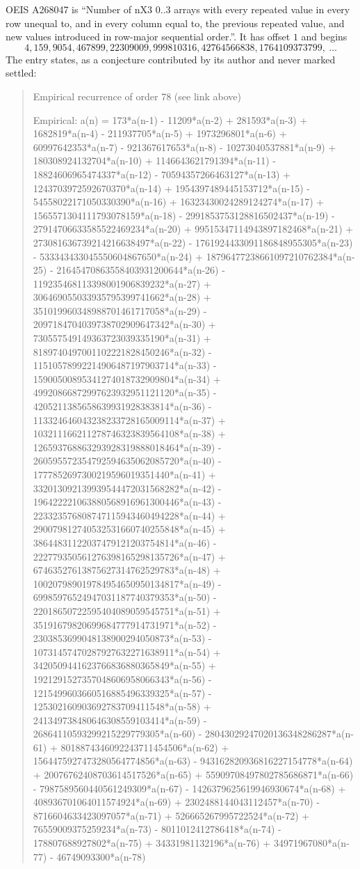 \documentclass[11pt,a4paper]{article}
\theoremstyle{plain}
\theoremstyle{definition}
\begin{document}
OEIS A268047 is ``Number of nX3 0..3 arrays with every repeated value in every row unequal to, and in every column equal to, the previous repeated value, and new values introduced in row-major sequential order.''. It has offset $1$ and begins
\[
4, 159, 9054, 467899, 22309009, 999810316, 42764566838, 1764109373799,\ \dots
\]
The entry states, as a conjecture contributed by its author and never marked settled:
\begin{quote}
Empirical recurrence of order 78 (see link above)

Empirical: a(n) = 173*a(n-1) - 11209*a(n-2) + 281593*a(n-3) + 1682819*a(n-4) - 211937705*a(n-5) + 1973296801*a(n-6) + 60997642353*a(n-7) - 921367617653*a(n-8) - 10273040537881*a(n-9) + 180308924132704*a(n-10) + 1146643621791394*a(n-11) - 18824606965474337*a(n-12) - 70594357266463127*a(n-13) + 1243703972592670370*a(n-14) + 1954397489445153712*a(n-15) - 54558022171050330390*a(n-16) + 16323430024289124274*a(n-17) + 1565571304111793078159*a(n-18) - 2991853753128816502437*a(n-19) - 27914706633585522469234*a(n-20) + 99515347114943897182468*a(n-21) + 273081636739214216638497*a(n-22) - 1761924433091186848955305*a(n-23) - 533343433045550604867650*a(n-24) + 18796477238661097210762384*a(n-25) - 21645470863558403931200644*a(n-26) - 119235468113398001906839232*a(n-27) + 306469055033935795399741662*a(n-28) + 351019960348988701461717058*a(n-29) - 2097184704039738702909647342*a(n-30) + 730557549149363723039335190*a(n-31) + 8189740497001102221828450246*a(n-32) - 11510578992214906487197903714*a(n-33) - 15900500895341274018732909804*a(n-34) + 49920866872997623932951121120*a(n-35) - 4205211385658639931928383814*a(n-36) - 113324646043238233728165009114*a(n-37) + 103211166211278746323839564108*a(n-38) + 126593768863293928319888018464*a(n-39) - 260595572354792594635062085720*a(n-40) - 1777852697300219596019351440*a(n-41) + 332013092139939544472031568282*a(n-42) - 196422221063880568916961300446*a(n-43) - 223323576808747115943460494228*a(n-44) + 290079812740532531660740255848*a(n-45) + 38644831122037479121203754814*a(n-46) - 222779350561276398165298135726*a(n-47) + 67463527613875627314762529783*a(n-48) + 100207989019784954650950134817*a(n-49) - 69985976524947031187740379353*a(n-50) - 22018650722595404089059545751*a(n-51) + 35191679820699684777914731971*a(n-52) - 2303853699048138900294050873*a(n-53) - 10731457470287927632271638911*a(n-54) + 3420509441623766836880365849*a(n-55) + 1921291527357048606958066343*a(n-56) - 1215499603660516885496339325*a(n-57) - 125302160903692783709411548*a(n-58) + 241349738480646308559103414*a(n-59) - 26864110593299215229779305*a(n-60) - 28043029247020136348286287*a(n-61) + 8018874346092243711454506*a(n-62) + 1564475927473280564774856*a(n-63) - 943162820936816227154778*a(n-64) + 20076762408703614517526*a(n-65) + 55909708497802785686871*a(n-66) - 7987589560440561249309*a(n-67) - 1426379625619946930674*a(n-68) + 408936701064011574924*a(n-69) + 2302488144043112457*a(n-70) - 8716604633423097057*a(n-71) + 526665267995722524*a(n-72) + 76559009375259234*a(n-73) - 8011012412786418*a(n-74) - 178807688927802*a(n-75) + 34331981132196*a(n-76) + 34971967080*a(n-77) - 46749093300*a(n-78)
\end{quote}
\end{document}
